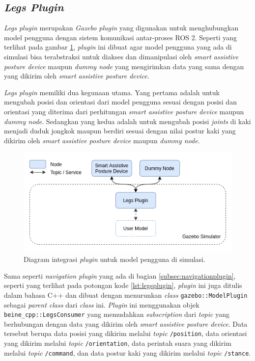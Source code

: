 \subsection{\emph{Legs Plugin}}
\label{subsec:legsplugin}

\emph{Legs plugin} merupakan \emph{Gazebo plugin} yang digunakan untuk menghubungkan model pengguna dengan sistem komunikasi antar-proses ROS 2.
Seperti yang terlihat pada gambar \ref{fig:integrasipluginpengguna},
  \emph{plugin} ini dibuat agar model pengguna yang ada di simulasi bisa terabstraksi untuk diakses dan dimanipulasi oleh \emph{smart assistive posture device} maupun \emph{dummy node} yang mengirimkan data yang sama dengan yang dikirim oleh \emph{smart assistive posture device}.

\emph{Legs plugin} memiliki dua kegunaan utama.
Yang pertama adalah untuk mengubah posisi dan orientasi dari model pengguna sesuai dengan posisi dan orientasi yang diterima dari perhitungan \emph{smart assistive posture device} maupun \emph{dummy node}.
Sedangkan yang kedua adalah untuk mengubah posisi \emph{joints} di kaki menjadi duduk jongkok maupun berdiri sesuai dengan nilai postur kaki yang dikirim oleh \emph{smart assistive posture device} maupun \emph{dummy node}.

\begin{figure}[ht]
  \centering
  \includegraphics[scale=0.5]{gambar/integrasi-plugin-pengguna.png}
  \caption{Diagram integrasi \emph{plugin} untuk model pengguna di simulasi.}
  \label{fig:integrasipluginpengguna}
\end{figure}



Sama seperti \emph{navigation plugin} yang ada di bagian \ref{subsec:navigationplugin},
  seperti yang terlihat pada potongan kode \ref{lst:legsplugin},
  \emph{plugin} ini juga ditulis dalam bahasa C++ dan dibuat dengan menurunkan \emph{class} \lstinline{gazebo::ModelPlugin} sebagai \emph{parent class} dari \emph{class} ini.
\emph{Plugin} ini menggunakan objek \lstinline{beine_cpp::LegsConsumer} yang memudahkan \emph{subscription} dari \emph{topic} yang berhubungan dengan data yang dikirim oleh \emph{smart assistive posture device}.
Data tersebut berupa data posisi yang dikirim melalui \emph{topic} \lstinline{/position},
  data orientasi yang dikirim melalui \emph{topic} \lstinline{/orientation},
  data perintah suara yang dikirim melalui \emph{topic} \lstinline{/command},
  dan data postur kaki yang dikirim melalui \emph{topic} \lstinline{/stance}.

